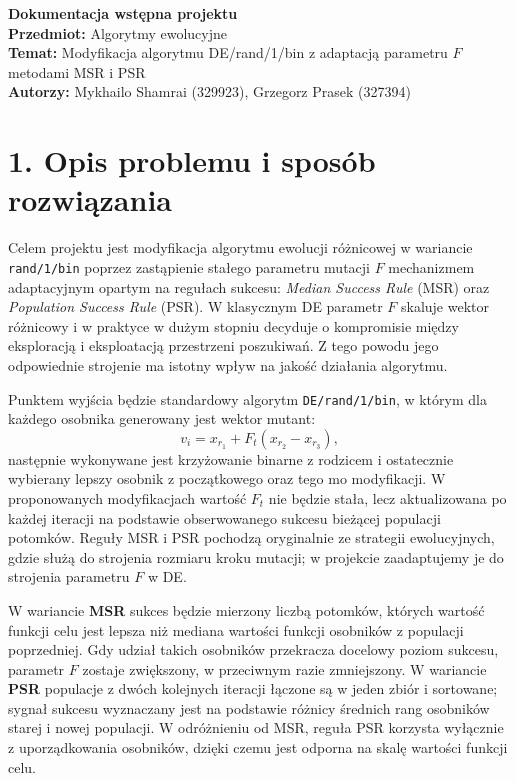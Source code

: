 \documentclass[11pt,a4paper]{article}
\begin{document}
\begin{center}
{\Large \textbf{Dokumentacja wstępna projektu}}\\[0.4em]
\textbf{Przedmiot:} Algorytmy ewolucyjne\\
\textbf{Temat:} Modyfikacja algorytmu DE/rand/1/bin z adaptacją parametru $F$ metodami MSR i PSR\\[0.4em]
\textbf{Autorzy:} Mykhailo Shamrai (329923), Grzegorz  Prasek (327394) 
\end{center}

\section*{1. Opis problemu i sposób rozwiązania}

Celem projektu jest modyfikacja algorytmu ewolucji różnicowej w wariancie \texttt{rand/1/bin} poprzez zastąpienie stałego parametru mutacji $F$ mechanizmem adaptacyjnym opartym na regułach sukcesu: \textit{Median Success Rule} (MSR) oraz \textit{Population Success Rule} (PSR). W klasycznym DE parametr $F$ skaluje wektor różnicowy i w praktyce w dużym stopniu decyduje o kompromisie między eksploracją i eksploatacją przestrzeni poszukiwań. Z tego powodu jego odpowiednie strojenie ma istotny wpływ na jakość działania algorytmu.

Punktem wyjścia będzie standardowy algorytm \texttt{DE/rand/1/bin}, w którym dla każdego osobnika generowany jest wektor mutant:
\[
v_i = x_{r_1} + F_t (x_{r_2} - x_{r_3}),
\]
następnie wykonywane jest krzyżowanie binarne z rodzicem i ostatecznie wybierany lepszy osobnik z początkowego oraz tego mo modyfikacji. W proponowanych modyfikacjach wartość $F_t$ nie będzie stała, lecz aktualizowana po każdej iteracji na podstawie obserwowanego sukcesu bieżącej populacji potomków. Reguły MSR i PSR pochodzą oryginalnie ze strategii ewolucyjnych, gdzie służą do strojenia rozmiaru kroku mutacji; w projekcie zaadaptujemy je do strojenia parametru $F$ w DE.

W wariancie \textbf{MSR} sukces będzie mierzony liczbą potomków, których wartość funkcji celu jest lepsza niż mediana wartości funkcji osobników z populacji poprzedniej. Gdy udział takich osobników przekracza docelowy poziom sukcesu, parametr $F$ zostaje zwiększony, w przeciwnym razie zmniejszony. W wariancie \textbf{PSR} populacje z dwóch kolejnych iteracji łączone są w jeden zbiór i sortowane; sygnał sukcesu wyznaczany jest na podstawie różnicy średnich rang osobników starej i nowej populacji. W odróżnieniu od MSR, reguła PSR korzysta wyłącznie z uporządkowania osobników, dzięki czemu jest odporna na skalę wartości funkcji celu.
\end{document}
